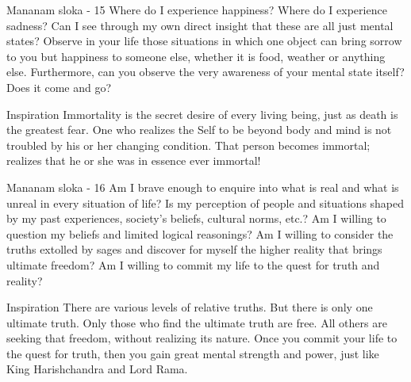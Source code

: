 \newpage
\begin{mananam}{\mananamfont Mananam sloka - 15}
\mananamtext Where do I experience happiness? Where do I experience sadness? Can I see through my own direct insight that these are all just mental states? Observe in your life those situations in which one object can bring sorrow to you but happiness to someone else, whether it is food, weather or anything else. Furthermore, can you observe the very awareness of your mental state itself? Does it come and go?
\end{mananam}
\WritingHand{}
\begin{inspiration}{\mananamfont Inspiration}
\mananamtext Immortality is the secret desire of every living being, just as death is the greatest fear. One who realizes the Self to be beyond body and mind is not troubled by his or her changing condition. That person becomes immortal; realizes that he or she was in essence ever immortal!
\end{inspiration}
\newpage

\newpage
\begin{mananam}{\mananamfont Mananam sloka - 16}
\mananamtext Am I brave enough to enquire into what is real and what is unreal in every situation of life? Is my perception of people and situations shaped by my past experiences, society’s beliefs, cultural norms, etc.? Am I willing to question my beliefs and limited logical reasonings? Am I willing to consider the truths extolled by sages and discover for myself the higher reality that brings ultimate freedom? 
Am I willing to commit my life to the quest for truth and reality?
\end{mananam}
\WritingHand{}
\begin{inspiration}{\mananamfont Inspiration}
\mananamtext There are various levels of relative truths. But there is only one ultimate truth. Only those who find the ultimate truth are free. All others are seeking that freedom, without realizing its nature. Once you commit your life to the quest for truth, then you gain great mental strength and power, just like King Harishchandra and Lord Rama.
\end{inspiration}
\newpage

